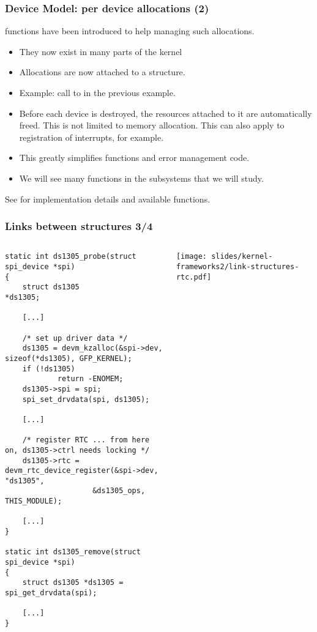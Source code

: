 \begin{frame}
  \frametitle{Device Model: per device allocations (2)}
   functions have been introduced
  to help managing such allocations.
  \begin{itemize}
  \item They now exist in many parts of the kernel
  \item Allocations are now attached to a 
	structure.
  \item Example: call to  in the
	previous example.
  \item Before each device is destroyed, the resources attached to it
        are automatically freed. This is not limited to memory
	allocation. This can also apply to registration of interrupts,
        for example.
  \item This greatly simplifies  functions and
	error management code.
  \item We will see many  functions in the subsystems
	that we will study.
  \end{itemize}
  See  for implementation details
  and available functions.
\end{frame}

\begin{frame}[fragile]
  \frametitle{Links between structures 3/4}
  \begin{columns}
    \begin{verbatim}
static int ds1305_probe(struct spi_device *spi)
{
    struct ds1305                   *ds1305;

    [...]

    /* set up driver data */
    ds1305 = devm_kzalloc(&spi->dev, sizeof(*ds1305), GFP_KERNEL);
    if (!ds1305)
            return -ENOMEM;
    ds1305->spi = spi;
    spi_set_drvdata(spi, ds1305);

    [...]

    /* register RTC ... from here on, ds1305->ctrl needs locking */
    ds1305->rtc = devm_rtc_device_register(&spi->dev, "ds1305",
                    &ds1305_ops, THIS_MODULE);

    [...]
}

static int ds1305_remove(struct spi_device *spi)
{
    struct ds1305 *ds1305 = spi_get_drvdata(spi);

    [...]
}
    \end{verbatim}
    \begin{center}
      \texttt{[image: slides/kernel-frameworks2/link-structures-rtc.pdf]}
    \end{center}
  \end{columns}
\end{frame}

